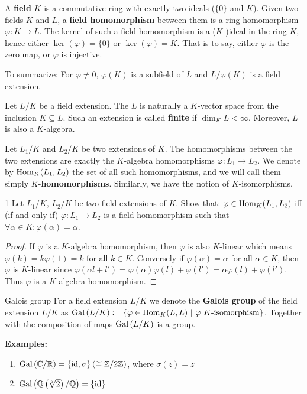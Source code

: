 \documentclass[twoside = false,	%
		headsepline,		%
		parskip = true,
		]{scrbook}						%
\begin{document}
        A \textbf{field} $K$ is a commutative ring with exactly two ideals ($\{0\}$ and $K$).
        Given two fields $K$ and $L$, a \textbf{field homomorphism} between them is a ring homomorphism $\varphi: K \rightarrow L$. The kernel of such a field homomorphism is a ($K$-)ideal in the ring $K$, hence either $\ker(\varphi) = \{0\}$ or $\ker(\varphi) = K$. That is to say, either $\varphi$ is the zero map, or $\varphi$ is injective.
        
        To summarize: For $\varphi \neq 0$, $\varphi(K)$ is a subfield of $L$ and $L/\varphi(K)$ is a field extension.

        \begin{definition*}{}
             Let $L/K$ be a field extension. The $L$ is naturally a $K$-vector space from the inclusion $K \subseteq L$. Such an extension is called \textbf{finite} if $\dim_K L < \infty$. Moreover, $L$ is also a $K$-algebra.
        \end{definition*}
       
        
        Let $L_1/K$ and $L_2/K$ be two extensions of $K$. The homomorphisms between the two extensions are exactly the $K$-algebra homomorphisms $\varphi: L_1 \rightarrow L_2$. We denote by $\mathrm{Hom}_K(L_1,L_2)$ the set of all such homomorphisms, and we will call them simply $K$-\textbf{homomorphisms}. Similarly, we have the notion of $K$-isomorphisms.
        
        \begin{exercise}{}{1}
                Let $L_1/K, \, L_2/K$ be two field extensions of $K$. Show that:
                $\varphi \in \mathrm{Hom}_K(L_1,L_2)$ iff (if and only if) $\varphi:L_1 \rightarrow L_2$ is a field homomorphism such that $\forall \alpha \in K: \varphi(\alpha) = \alpha$.
        \end{exercise}
        \begin{proof}
            If $\varphi$ is a $K$-algebra homomorphism, then $\varphi$ is also $K$-linear which means $\varphi(k) = k\varphi(1) = k$ for all $k \in K$. Conversely if $\varphi(\alpha)=\alpha$ for all $\alpha \in K$, then $\varphi$ is $K$-linear since $\varphi(\alpha l+l') = \varphi(\alpha) \varphi(l) + \varphi(l') = \alpha \varphi(l) + \varphi(l')$. Thus $\varphi$ is a $K$-algebra homomorphism.
        \end{proof}
        
        \begin{definition*}{Galois group}
                For a field extension $L/K$ we denote the \textbf{Galois group} of the field extension $L/K$ as $\mathrm{Gal}\left( L/K\right):= \{\varphi \in \mathrm{Hom}_K(L,L) \ | \ \varphi \ K\text{-isomorphism}\}$. Together with the composition of maps $\mathrm{Gal}\left( L/K\right)$ is a group.
        \end{definition*}
        \textbf{Examples:}
            \begin{enumerate}
                \item $\mathrm{Gal}\left( \mathbb C/\mathbb R\right) = \{\mathrm{id},\sigma\} \left(\cong \mathbb Z/2\mathbb Z\right)$, where $\sigma(z) = \overline{z}$
                \item $\mathrm{Gal}\left( \mathbb Q\left( \sqrt[3]{2}\right)/\mathbb Q\right) = \{\mathrm{id}\}$
            \end{enumerate}
        
\end{document}
